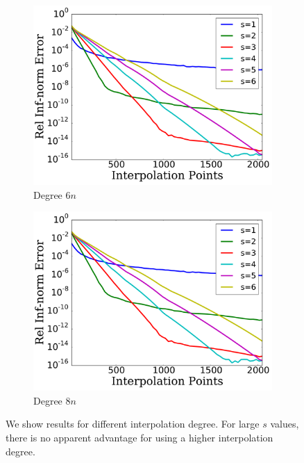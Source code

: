 \begin{figure}[p]
    \begin{subfigure}{0.45\textwidth}
    \includegraphics[width=\textwidth]{plots/msn_interp_fast_6n_rough_heaviside_2.pdf}
    \caption{Degree $6n$}
    \end{subfigure}
    \begin{subfigure}{0.45\textwidth}
    \includegraphics[width=\textwidth]{plots/msn_interp_fast_8n_rough_heaviside_2.pdf}
    \caption{Degree $8n$}
    \end{subfigure}
\caption[Example Plots of MSN Interpolation of Various Degrees]{
We show results for different interpolation degree.
For large $s$ values, there is no apparent advantage for using
a higher interpolation degree.
}
\label{fig:msn_comp_degree}
\end{figure}



